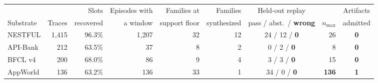 \begin{tabular}{@{}lrrrrrcrc@{}}
\toprule
& & Slots & Episodes with & Families at & Families & Held-out replay & & Artifacts \\
Substrate & Traces & recovered & a window & support floor & synthesized & pass / abst.\ / \textbf{wrong} & $n_{\max}$ & admitted \\
\midrule
NESTFUL  & 1{,}415 & 96.3\% & 1{,}207 & 32 & 12 & 24 / 12 / \textbf{0} & 26 & \textbf{0} \\
API-Bank &     212 & 63.5\% &      37 &  8 &  2 &  0 /  2 / \textbf{0} &  8 & \textbf{0} \\
BFCL v4  &     200 & 68.0\% &      86 &  9 &  4 &  3 /  3 / \textbf{0} & 15 & \textbf{0} \\
AppWorld &     136 & 63.2\% &     136 & 33 &  1 & 34 /  0 / \textbf{0} & \textbf{136} & \textbf{1} \\
\bottomrule
\end{tabular}
